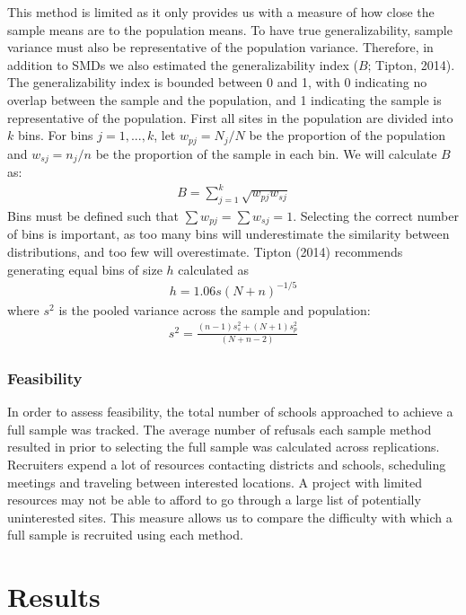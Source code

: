 \documentclass[man,floatsintext]{apa6}
\theoremstyle{definition}
\theoremstyle{definition}
\theoremstyle{definition}
\theoremstyle{remark}
\begin{document}
This method is limited as it only provides us with a measure of how
close the sample means are to the population means. To have true
generalizability, sample variance must also be representative of the
population variance. Therefore, in addition to SMDs we also estimated
the generalizability index (\(B\); Tipton, 2014). The generalizability
index is bounded between 0 and 1, with 0 indicating no overlap between
the sample and the population, and 1 indicating the sample is
representative of the population. First all sites in the population are
divided into \(k\) bins. For bins \(j = 1,...,k\), let
\(w_{pj} = N_j/N\) be the proportion of the population and
\(w_{sj} = n_j/n\) be the proportion of the sample in each bin. We will
calculate \(B\) as: \begin{align}
  B = \sum^k_{j=1}\sqrt{w_{pj}w_{sj}}
\end{align} Bins must be defined such that
\(\sum{w_{pj}} = \sum{w_{sj}} = 1\). Selecting the correct number of
bins is important, as too many bins will underestimate the similarity
between distributions, and too few will overestimate. Tipton (2014)
recommends generating equal bins of size \(h\) calculated as
\begin{align}
  h = 1.06s(N+n)^{-1/5}
\end{align} where \(s^2\) is the pooled variance across the sample and
population: \begin{align}
  s^2 = \frac{(n - 1)s^2_s + (N + 1)s^2_p}{(N + n - 2)}
\end{align}

\hypertarget{feasibility}{%
\subsubsection{Feasibility}\label{feasibility}}

In order to assess feasibility, the total number of schools approached
to achieve a full sample was tracked. The average number of refusals
each sample method resulted in prior to selecting the full sample was
calculated across replications. Recruiters expend a lot of resources
contacting districts and schools, scheduling meetings and traveling
between interested locations. A project with limited resources may not
be able to afford to go through a large list of potentially uninterested
sites. This measure allows us to compare the difficulty with which a
full sample is recruited using each method.

\hypertarget{results}{%
\section{Results}\label{results}}
\end{document}
